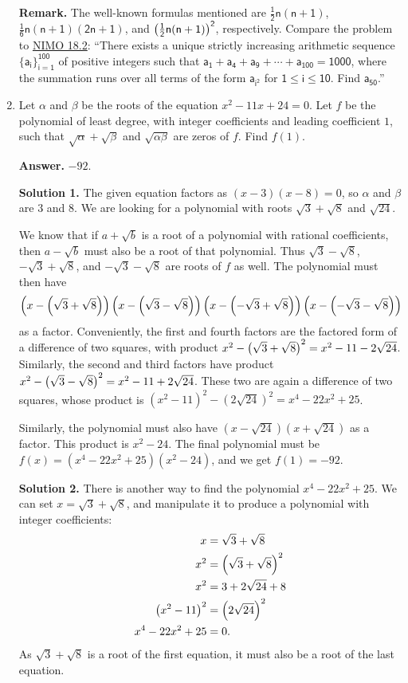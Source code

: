 \documentclass[11pt,paper=letter]{scrartcl}
\begin{document}
\begin{enumerate}[left=0pt]
{\small \sffamily \textbf{Remark.} The well-known formulas mentioned are $\mathsf{\frac12n(n+1)}$, $\mathsf{\frac16n(n+1)(2n+1)}$, and $\mathsf{\left( \frac12n(n+1) \right)^2}$, respectively. Compare the problem to \href{http://artofproblemsolving.com/community/c139h1065734p4629732}{NIMO 18.2}: ``There exists a unique strictly increasing arithmetic sequence $\mathsf{\{a_i\}_{i=1}^{100}}$ of positive integers such that $\mathsf{a_1+a_4+a_9+\cdots+a_{100}=\text{1000}}$, where the summation runs over all terms of the form $\mathsf{a_{i^2}}$ for $\mathsf{1\leq i\leq 10}$. Find $\mathsf{a_{50}}$.''}

\item Let $\alpha$ and $\beta$ be the roots of the equation $x^2 - 11x + 24 = 0$. Let $f$ be the polynomial of least degree, with integer coefficients and leading coefficient $1$, such that $\sqrt{\alpha} + \sqrt{\beta}$ and $\sqrt{\alpha\beta}$ are zeros of $f$. Find $f(1)$.

{\sffamily \bfseries Answer.} $\boxed{-92}$.

{\sffamily \bfseries Solution 1.} The given equation factors as $(x-3)(x-8) = 0$, so $\alpha$ and $\beta$ are $3$ and $8$. We are looking for a polynomial with roots $\sqrt{3} + \sqrt{8}$ and $\sqrt{24}$.

We know that if $a + \sqrt b$ is a root of a polynomial with rational coefficients, then $a - \sqrt b$ must also be a root of that polynomial. Thus $\sqrt{3} - \sqrt{8}$, $-\sqrt{3} + \sqrt{8}$, and $-\sqrt{3} -\sqrt{8}$ are roots of $f$ as well. The polynomial must then have $$\left( x - \left( \sqrt{3} + \sqrt{8} \right) \right)\left( x - \left( \sqrt{3} - \sqrt{8} \right) \right)\left( x - \left( - \sqrt{3} + \sqrt{8} \right) \right)\left( x - \left( - \sqrt{3} - \sqrt{8} \right) \right)$$ as a factor. Conveniently, the first and fourth factors are the factored form of a difference of two squares, with product $x^2 - \left( \sqrt{3} + \sqrt{8} \right)^2 = x^2 - 11 - 2\sqrt{24}$. Similarly, the second and third factors have product $x^2 - \left( \sqrt{3} - \sqrt{8} \right)^2 = x^2 - 11 + 2\sqrt{24}$. These two are again a difference of two squares, whose product is $(x^2 - 11)^2 - (2\sqrt{24})^2 = x^4 - 22x^2 + 25$.

Similarly, the polynomial must also have $(x - \sqrt{24})(x + \sqrt{24})$ as a factor. This product is $x^2 - 24$. The final polynomial must be $f(x) = (x^4 - 22x^2 + 25)(x^2 - 24)$, and we get $f(1) = -92$.

{\sffamily \bfseries Solution 2.} There is another way to find the polynomial $x^4 - 22x^2 + 25$. We can set $x = \sqrt{3} + \sqrt{8}$, and manipulate it to produce a polynomial with integer coefficients:
\begin{align*}
  x &= \sqrt{3} + \sqrt{8} \\
  x^2 &= \left( \sqrt3 + \sqrt8 \right)^2 \\
  x^2 &= 3 + 2\sqrt{24} + 8 \\
  \left( x^2 - 11 \right)^2 &= \left( 2\sqrt{24} \right)^2 \\
  x^4 - 22x^2 + 25 &= 0.
\end{align*}
As $\sqrt{3} + \sqrt{8}$ is a root of the first equation, it must also be a root of the last equation.


\end{enumerate}
\end{document}
